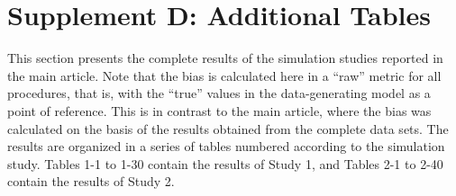 \documentclass[doc,12pt]{apa6}
\begin{document}
\section{Supplement D: Additional Tables}
\label{sec:supd}

\noindent
This section presents the complete results of the simulation studies reported in the main article.
Note that the bias is calculated here in a ``raw'' metric for all procedures, that is, with the ``true'' values in the data-generating model as a point of reference.
This is in contrast to the main article, where the bias was calculated on the basis of the results obtained from the complete data sets.
The results are organized in a series of tables numbered according to the simulation study. Tables 1-1 to 1-30 contain the results of Study 1, and Tables 2-1 to 2-40 contain the results of Study 2.

\clearpage
{}

\setcounter{table}{0}
\renewcommand{\thetable}{1-\arabic{table}}


\clearpage
{}

\setcounter{table}{0}
\renewcommand{\thetable}{2-\arabic{table}}


\clearpage
\restoregeometry



\end{document}
